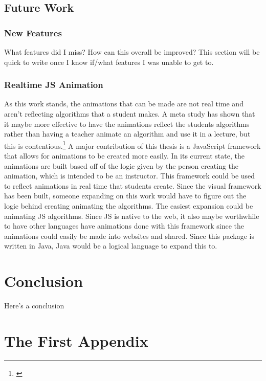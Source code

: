\documentclass[12pt,twoside]{reedthesis}
\begin{document}
\section{Future Work}

\subsection{New Features}
What features did I miss? How can this overall be improved? This section will be quick to write once I know if/what features I was unable to get to. 

\subsection{Realtime JS Animation}
As this work stands, the animations that can be made are not real time and aren't reflecting algorithms that a student makes. A meta study has shown that it maybe more effective to have the animations reflect the students algorithms rather than having a teacher animate an algorithm and use it in a lecture, but this is contentious.\footnote{\cite{hundhausen_meta-study_2002}} A major contribution of this thesis is a JavaScript framework that allows for animations to be created more easily. In its current state, the animations are built based off of the logic given by the person creating the animation, which is intended to be an instructor. This framework could be used to reflect animations in real time that students create. Since the visual framework has been built, someone expanding on this work would have to figure out the logic behind creating animating the algorithms. The easiest expansion could be animating JS algorithms. Since JS is native to the web, it also maybe worthwhile to have other languages have animations done with this framework since the animations could easily be made into websites and shared. Since this package is written in Java, Java would be a logical language to expand this to. 


	
\chapter*{Conclusion}
	\setcounter{chapter}{4}
	\setcounter{section}{0}
	
Here's a conclusion
    \appendix
      \chapter{The First Appendix}
\end{document}
